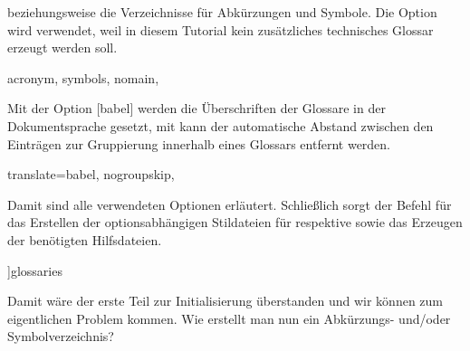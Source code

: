 \documentclass[english,ngerman]{tudscrartcl}
\begin{document}
beziehungsweise die Verzeichnisse für Abkürzungen und Symbole. Die Option  
 wird verwendet, weil in diesem Tutorial kein zusätzliches 
technisches Glossar erzeugt werden soll.
%
\begin{Tutorial-}
  acronym,%
  symbols,%
  nomain,%
\end{Tutorial-}
%
Mit der Option [babel] werden die Überschriften der Glossare 
in der Dokumentsprache gesetzt, mit  kann der automatische 
Abstand zwischen den Einträgen zur Gruppierung innerhalb eines Glossars 
entfernt werden.
%
\begin{Tutorial-}
  translate=babel,%
  nogroupskip,%
\end{Tutorial-}
%
Damit sind alle verwendeten Optionen erläutert. Schließlich sorgt der Befehl 
 für das Erstellen der optionsabhängigen Stildateien für 
 respektive  sowie das Erzeugen der 
benötigten Hilfsdateien.
%
\begin{Tutorial-}
]{glossaries}
\makeglossaries
\end{Tutorial-}
%
Damit wäre der erste Teil zur Initialisierung überstanden und wir können zum 
eigentlichen Problem kommen. Wie erstellt man nun ein Abkürzungs- und/oder 
Symbolverzeichnis?
\end{document}
